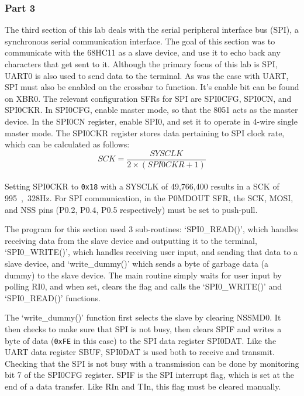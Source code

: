 \documentclass[12pt]{article}
\begin{document}
\subsubsection{Part 3}
The third section of this lab deals with the serial peripheral interface bus (SPI), a synchronous serial communication interface. The goal of this section was to communicate with the 68HC11 as a slave device, and use it to echo back any characters that get sent to it. Although the primary focus of this lab is SPI, UART0 is also used to send data to the terminal. As was the case with UART, SPI must also be enabled on the crossbar to function. It's enable bit can be found on XBR0. The relevant configuration SFRs for SPI are SPI0CFG, SPI0CN, and SPI0CKR. In SPI0CFG, enable master mode, so that the 8051 acts as the master device. In the SPI0CN register, enable SPI0, and set it to operate in 4-wire single master mode. The SPI0CKR register stores data pertaining to SPI clock rate, which can be calculated as follows:\\
\begin{equation}
SCK = \frac{SYSCLK}{2\times(SPI0CKR+1)}
\end{equation}\\
Setting SPI0CKR to \texttt{0x18} with a SYSCLK of 49,766,400 results in a SCK of \si{995,328}{Hz}. For SPI communication, in the P0MDOUT SFR, the SCK, MOSI, and NSS pins (P0.2, P0.4, P0.5 respectively) must be set to push-pull.

The program for this section used 3 sub-routines: `SPI0\_READ()', which handles receiving data from the slave device and outputting it to the terminal, `SPI0\_WRITE()', which handles receiving user input, and sending that data to a slave device, and `write\_dummy()' which sends a byte of garbage data (a dummy) to the slave device. The main routine simply waits for user input by polling RI0, and when set, clears the flag and calls the  `SPI0\_WRITE()' and `SPI0\_READ()' functions.

The `write\_dummy()' function first selects the slave by clearing NSSMD0. It then checks to make sure that SPI is not busy, then clears SPIF and writes a byte of data (\texttt{0xFE} in this case) to the SPI data register SPI0DAT. Like the UART data register SBUF, SPI0DAT is used both to receive and transmit. Checking that the SPI is not busy with a transmission can be done by monitoring bit 7 of the SPI0CFG register. SPIF is the SPI interrupt flag, which is set at the end of a data transfer. Like RIn and TIn, this flag must be cleared manually. 
\end{document}
